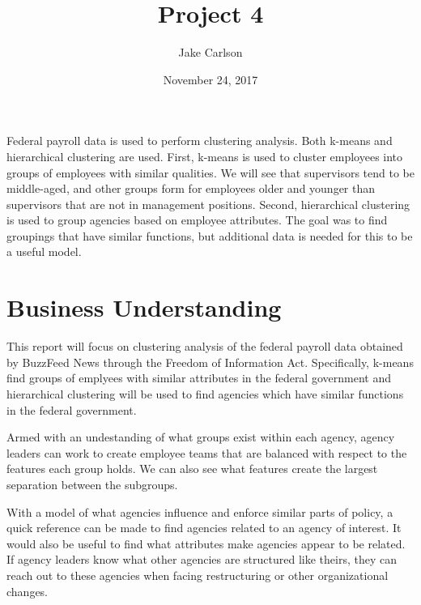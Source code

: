 \documentclass{article}
\begin{document}
\title{Project 4}
\author{Jake Carlson}
\date{November 24, 2017}
\maketitle

\abstract
Federal payroll data is used to perform clustering analysis. Both k-means and hierarchical clustering are used. First, k-means is used to cluster employees into groups of employees with similar qualities. We will see that supervisors tend to be middle-aged, and other groups form for employees older and younger than supervisors that are not in management positions. Second, hierarchical clustering is used to group agencies based on employee attributes. The goal was to find groupings that have similar functions, but additional data is needed for this to be a useful model.

\newpage

\tableofcontents
\newpage

\section{Business Understanding}
This report will focus on clustering analysis of the federal payroll data obtained by BuzzFeed News through the Freedom of Information Act. Specifically, k-means find groups of emplyees with similar attributes in the federal government and hierarchical clustering will be used to find agencies which have similar functions in the federal government.
\par
Armed with an undestanding of what groups exist within each agency, agency leaders can work to create employee teams that are balanced with respect to the features each group holds. We can also see what features create the largest separation between the subgroups.
\par
With a model of what agencies influence and enforce similar parts of policy, a quick reference can be made to find agencies related to an agency of interest. It would also be useful to find what attributes make agencies appear to be related. If agency leaders know what other agencies are structured like theirs, they can reach out to these agencies when facing restructuring or other organizational changes.
\end{document}
